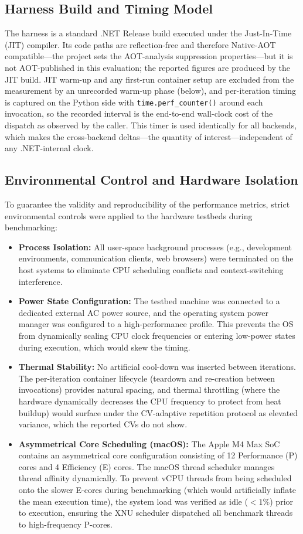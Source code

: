 \subsection{Harness Build and Timing Model}
The harness is a standard .NET Release build executed under the Just-In-Time (JIT) compiler. Its code paths are reflection-free and therefore Native-AOT compatible---the project sets the AOT-analysis suppression properties---but it is not AOT-published in this evaluation; the reported figures are produced by the JIT build. JIT warm-up and any first-run container setup are excluded from the measurement by an unrecorded warm-up phase (below), and per-iteration timing is captured on the Python side with \texttt{time.perf\_counter()} around each invocation, so the recorded interval is the end-to-end wall-clock cost of the dispatch as observed by the caller. This timer is used identically for all backends, which makes the cross-backend deltas---the quantity of interest---independent of any .NET-internal clock.

\subsection{Environmental Control and Hardware Isolation}
To guarantee the validity and reproducibility of the performance metrics, strict environmental controls were applied to the hardware testbeds during benchmarking:
\begin{itemize}
    \item \textbf{Process Isolation:} All user-space background processes (e.g., development environments, communication clients, web browsers) were terminated on the host systems to eliminate CPU scheduling conflicts and context-switching interference.
    \item \textbf{Power State Configuration:} The testbed machine was connected to a dedicated external AC power source, and the operating system power manager was configured to a high-performance profile. This prevents the OS from dynamically scaling CPU clock frequencies or entering low-power states during execution, which would skew the timing.
    \item \textbf{Thermal Stability:} No artificial cool-down was inserted between iterations. The per-iteration container lifecycle (teardown and re-creation between invocations) provides natural spacing, and thermal throttling (where the hardware dynamically decreases the CPU frequency to protect from heat buildup) would surface under the CV-adaptive repetition protocol as elevated variance, which the reported CVs do not show.
    \item \textbf{Asymmetrical Core Scheduling (macOS):} The Apple M4 Max SoC contains an asymmetrical core configuration consisting of 12 Performance (P) cores and 4 Efficiency (E) cores. The macOS thread scheduler manages thread affinity dynamically. To prevent vCPU threads from being scheduled onto the slower E-cores during benchmarking (which would artificially inflate the mean execution time), the system load was verified as idle ($<1\%$) prior to execution, ensuring the XNU scheduler dispatched all benchmark threads to high-frequency P-cores.
\end{itemize}

